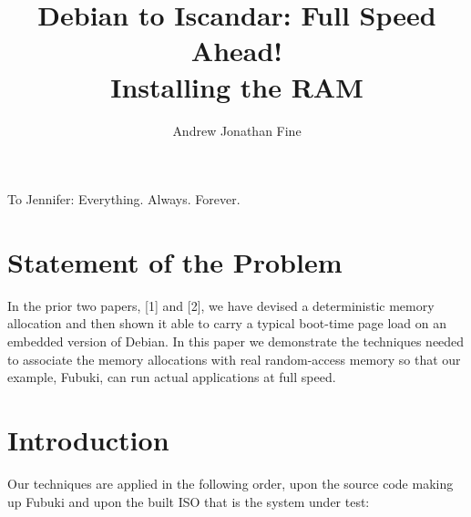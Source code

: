 \documentclass[11pt]{article}
\title{Debian to Iscandar: Full Speed Ahead!\\[0.6em] \large Installing the RAM}
\author{Andrew Jonathan Fine}
\date{}
\begin{document}
\maketitle

\thispagestyle{empty}
\newpage

\vspace*{\fill}
\begin{center}
To Jennifer: Everything. Always. Forever.
\end{center}
\vspace*{\fill}

\newpage


\begin{abstract}
\end{abstract}

\section*{Statement of the Problem}
In the prior two papers, [1] and [2], we have devised a deterministic memory allocation and then shown it able to carry a typical boot-time page load on an embedded version of Debian. In this paper we demonstrate the techniques needed to associate the memory allocations with real random-access memory so that our example, Fubuki, can run actual applications at full speed.

\section{Introduction}

Our techniques are applied in the following order, upon the source
code making up Fubuki and upon the built ISO that is the system
under test:
\end{document}
